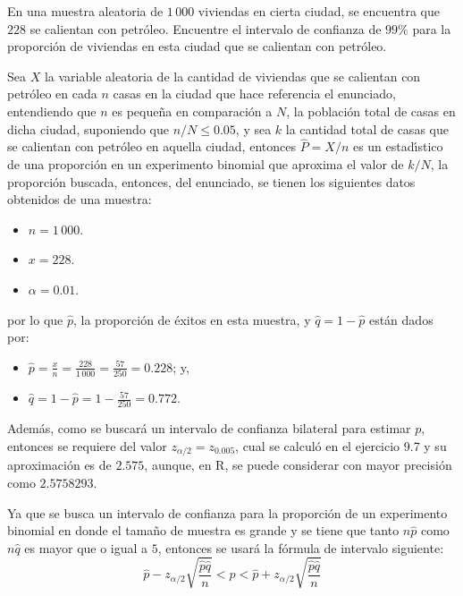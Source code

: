 \begin{enunciado}
 En una muestra aleatoria de $1\,000$ viviendas en cierta ciudad, se encuentra que $228$ se calientan con petr\'oleo. Encuentre el intervalo de confianza de $99\%$ para la proporci\'on de viviendas en esta ciudad que se calientan con petr\'oleo.
\end{enunciado}

\begin{solucion}
 Sea $X$ la variable aleatoria de la cantidad de viviendas que se calientan con petr\'oleo en cada $n$ casas en la ciudad que hace referencia el enunciado, entendiendo que $n$ es peque\~na en comparaci\'on a $N$, la poblaci\'on total de casas en dicha ciudad, suponiendo que $n/N \leq 0.05$, y sea $k$ la cantidad total de casas que se calientan con petr\'oleo en aquella ciudad, entonces $\widehat{P} = X/n$ es un estad\'{\i}stico de una proporci\'on en un experimento binomial que aproxima el valor de $k/N$, la proporci\'on buscada, entonces, del enunciado, se tienen los siguientes datos obtenidos de una muestra:
 \begin{itemize}
  \item $n=1\,000$.
  \item $x=228$.
  \item $\alpha=0.01$.
 \end{itemize}
 por lo que $\hat{p}$, la proporci\'on de \'exitos en esta muestra, y $\hat{q} = 1-\hat{p}$ est\'an dados por:
 \begin{itemize}
  \item $\hat{p} = \frac{x}{n} = \frac{228}{1\,000} = \frac{57}{250} = 0.228$; y,
  \item $\hat{q} = 1-\hat{p} = 1 - \frac{57}{250} = 0.772$.
 \end{itemize}
 Adem\'as, como se buscar\'a un intervalo de confianza bilateral para estimar $p$, entonces se requiere del valor $z_{\alpha/2} = z_{0.005}$, cual se calcul\'o en el ejercicio 9.7 y su aproximaci\'on es de $2.575$, aunque, en R, se puede considerar con mayor precisi\'on como $2.5758293$.
 \par 
 Ya que se busca un intervalo de confianza para la proporci\'on de un experimento binomial en donde el tama\~no de muestra es grande y se tiene que tanto $n\hat{p}$ como $n\hat{q}$ es mayor que o igual a $5$, entonces se usar\'a la f\'ormula de intervalo siguiente:
 \begin{equation*}
  \hat{p} - z_{\alpha/2}\sqrt{\frac{\hat{p}\hat{q}}{n}} < p < \hat{p} + z_{\alpha/2}\sqrt{\frac{\hat{p}\hat{q}}{n}}
 \end{equation*}

\end{solucion}
